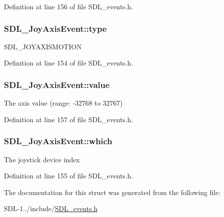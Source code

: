 Definition at line 156 of file S\+D\+L\+\_\+events.\+h.

\hypertarget{struct_s_d_l___joy_axis_event_ab49b38845a4326b1591f7c8fadc6e5ad}{}
\subsubsection[{type}]{ S\+D\+L\+\_\+\+Joy\+Axis\+Event\+::type}\label{struct_s_d_l___joy_axis_event_ab49b38845a4326b1591f7c8fadc6e5ad}
S\+D\+L\+\_\+\+J\+O\+Y\+A\+X\+I\+S\+M\+O\+T\+I\+O\+N 

Definition at line 154 of file S\+D\+L\+\_\+events.\+h.

\hypertarget{struct_s_d_l___joy_axis_event_a53ee73e7c367934dd6edb69963be5556}{}
\subsubsection[{value}]{ S\+D\+L\+\_\+\+Joy\+Axis\+Event\+::value}\label{struct_s_d_l___joy_axis_event_a53ee73e7c367934dd6edb69963be5556}
The axis value (range\+: -\/32768 to 32767) 

Definition at line 157 of file S\+D\+L\+\_\+events.\+h.

\hypertarget{struct_s_d_l___joy_axis_event_a41a7483a5520986f340808da16e08775}{}
\subsubsection[{which}]{ S\+D\+L\+\_\+\+Joy\+Axis\+Event\+::which}\label{struct_s_d_l___joy_axis_event_a41a7483a5520986f340808da16e08775}
The joystick device index 

Definition at line 155 of file S\+D\+L\+\_\+events.\+h.



The documentation for this struct was generated from the following file\+:\begin{DoxyCompactItemize}
\item 
S\+D\+L-\/1../include/\hyperlink{_s_d_l__events_8h}{S\+D\+L\+\_\+events.\+h}\end{DoxyCompactItemize}
